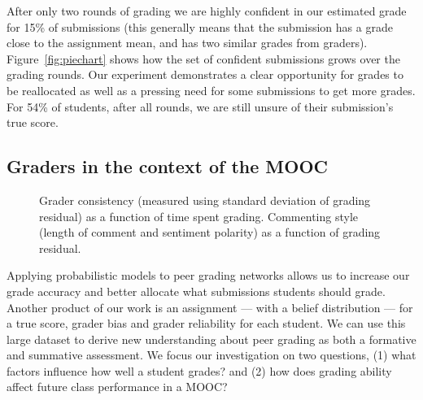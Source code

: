 After only two rounds of grading we are highly confident in our estimated grade for 15\% of submissions (this generally means that the submission has a grade close to the assignment mean, and has two similar grades from graders). Figure~\ref{fig:piechart} shows how the set of confident submissions grows over the grading rounds. Our experiment demonstrates a clear opportunity for grades to be reallocated as well as a pressing need for some submissions to get more grades. For 54\% of students, after all rounds, we are still unsure of their submission's true score.

\subsection{Graders in the context of the MOOC}
\begin{figure}[t!]
\begin{center}
\;\;
\end{center}
\caption[Insight into peer graders]{
  Grader consistency (measured using standard deviation of grading residual) as
a function of time spent grading.
 Commenting style (length of comment and sentiment polarity) as a function of grading residual.
}
\end{figure}

Applying probabilistic models to peer grading networks allows us to increase our grade accuracy and better allocate
what submissions students should grade. Another product
of our work is an assignment --- with a belief distribution --- for a true score, grader bias and grader reliability
for each student. We can use this large dataset to derive
new understanding about peer grading as both a formative
and summative assessment. We focus our investigation on
two questions, (1) what factors influence  how well a student
grades? and (2) how does grading ability affect future class
performance in a MOOC?

